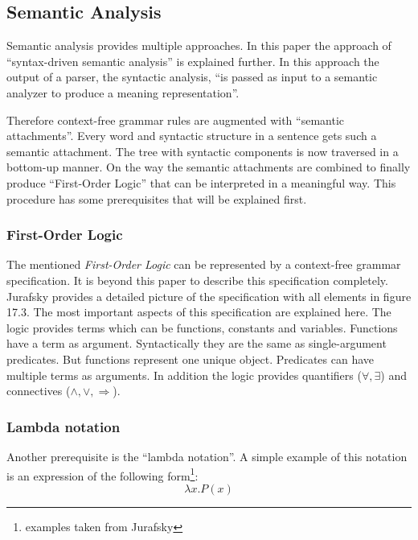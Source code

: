 \documentclass[12pt,twoside]{scrartcl}
\theoremstyle{plain}
\theoremstyle{definition}
\theoremstyle{remark}
\begin{document}
	\subsection{Semantic Analysis}
	\label{subSec:semanticAnalysis}
	
		Semantic analysis provides multiple approaches. In this paper the approach of ``syntax-driven semantic analysis''\cite[p.~617]{Jurafsky2009} is explained further. In this approach the output of a parser, the syntactic analysis, ``is passed as input to a semantic analyzer to produce a meaning representation''\cite[p.~618]{Jurafsky2009}.

		Therefore context-free grammar rules are augmented with ``semantic attachments''\cite[p.~618]{Jurafsky2009}. Every word and syntactic structure in a sentence gets such a semantic attachment. The tree with syntactic components is now traversed in a bottom-up manner. On the way the semantic attachments are combined to finally produce ``First-Order Logic''\cite[p.~589]{Jurafsky2009a} that can be interpreted in a meaningful way. This procedure has some prerequisites that will be explained first.
		
		\subsubsection*{First-Order Logic}
		\label{subSubSec:firstOrderLogic}
		
		The mentioned \textit{First-Order Logic} can be represented by a context-free grammar specification. It is beyond this paper to describe this specification completely. Jurafsky\cite{Jurafsky2009a} provides a detailed picture of the specification with all elements in figure 17.3. The most important aspects of this specification are explained here. The logic provides terms which can be functions, constants and variables. Functions have a term as argument. Syntactically they are the same as single-argument predicates. But functions represent one unique object.
		Predicates can have multiple terms as arguments. In addition the logic provides quantifiers ($\forall, \exists$) and connectives ($\wedge, \vee, \Rightarrow$).
		
		\subsubsection*{Lambda notation}
		\label{subSubSec:lambdaNotation}
		
		Another prerequisite is the ``lambda notation''\cite[p.~593]{Jurafsky2009a}. A simple example of this notation is an expression of the following form\footnote{examples taken from Jurafsky\cite[pp.~593-594]{Jurafsky2009a}}:		
		\[
			\lambda x.P(x)
		\]
		
\end{document}
